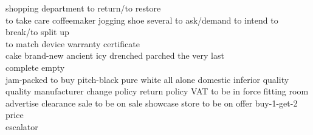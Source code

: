 \documentclass[addpoints,a4paper,11pt]{exam}
\begin{document}
\begin{questions}
\begin{multicols}{3}
      \question shopping \fillin
      \question department \fillin[][0.6in]
      \question to return/to restore\\ \fillin
      \question to take care \fillin[][0.6in]
      \question coffeemaker \fillin[][0.6in]
      \question jogging shoe \fillin[][0.6in]
      \question several \fillin[][0.6in]
      \question to ask/demand \fillin[][0.6in]
      \question to intend \fillin[][0.5in]
      \question to break/to split up \\
      \fillin[hajota]
      \question to match \fillin[sovittaa][0.6in]
      \question device  \fillin[laite][0.5in]
      \question warranty certificate \\ \fillin[takuutodistus]
      \question cake \fillin[leivos][0.5in]
      \question brand-new \fillin[upouusi][0.5in]
      \question ancient \fillin[ikivanha][0.5in]
      \question icy \fillin[jääkylmä]
      \question drenched \fillin[likomärkä]
      \question parched \fillin[rutikuiva]
      \question the very last \\\fillin[vihoviimeinen]
      \question complete empty \\\fillin[typötyhjä]
      \question jam-packed \fillin[täpötäysi][0.6in]
      \question to buy \fillin[hankkia][0.5in]
      \question pitch-black \fillin[pilkkopimeä][0.8in]
      \question pure white \fillin[vitivalkoinen][0.7in]
      \question all alone \fillin[ypöyksin][0.5in]
      \question domestic \fillin[kotimainen][0.5in]
      \question inferior quality \fillin[huonolaatuinen]
      \question quality \fillin[laatu][0.5in]
      \question manufacturer \fillin[valmistaja][0.7in]
      \question change policy 
      \question return policy \fillin[palautusoikeus]
      \question VAT \fillin[arvonlisävero]
      \question to be in force 
      \question fitting room \fillin[sovituskoppi]
      \question advertise \fillin[mainostaa]
      \question clearance sale \fillin[alennusmyynti]
      \question to be on sale 
      \question showcase \fillin[näyteikkuna]
      \question store \fillin[myymälä]
      \question to be on offer 
      \question buy-1-get-2 price \\
      \question escalator \fillin[liukuportaat]
    \end{multicols}
  \end{questions}
\end{document}
